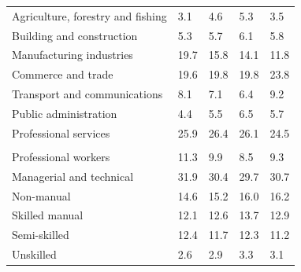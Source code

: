 \documentclass{article}
\begin{document}
\begin{table}[h]
\begin{tabular}{KTTTT}
    \hline
Agriculture, forestry and fishing  & 3.1& 4.6& 5.3& 3.5\\
Building and construction & 5.3& 5.7& 6.1& 5.8\\
Manufacturing industries & 19.7& 15.8& 14.1& 11.8\\
Commerce and trade  & 19.6& 19.8& 19.8& 23.8\\
Transport and communications  & 8.1& 7.1& 6.4& 9.2\\
Public administration & 4.4& 5.5& 6.5& 5.7\\
Professional services & 25.9& 26.4& 26.1& 24.5\\
\hline
    \\ 
    \hline
Professional workers  & 11.3&  9.9 &  8.5&  9.3\\
Managerial and technical & 31.9& 30.4& 29.7& 30.7\\
Non-manual & 14.6& 15.2& 16.0& 16.2\\
Skilled manual & 12.1& 12.6& 13.7& 12.9\\
Semi-skilled & 12.4& 11.7& 12.3& 11.2\\
Unskilled  & 2.6& 2.9& 3.3& 3.1\\
\end{tabular}
\end{table}
\pagebreak
\end{document}
